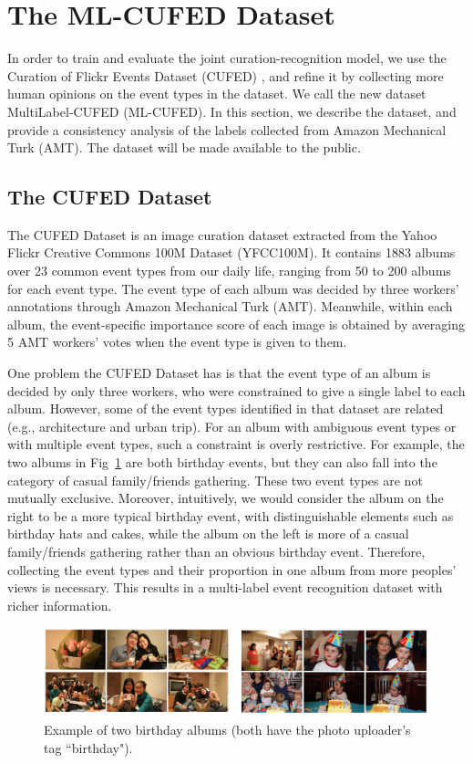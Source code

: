 \documentclass[runningheads]{llncs}
\begin{document}
\section{The ML-CUFED Dataset}
In order to train and evaluate the joint curation-recognition model, we use the Curation of Flickr Events Dataset (CUFED) \cite{CVPR}, and refine it by collecting more human opinions on the event types in the dataset. We call the new dataset MultiLabel-CUFED (ML-CUFED). In this section, we describe the dataset, and provide a consistency analysis of the labels collected from Amazon Mechanical Turk (AMT). The dataset will be made available to the public.
\subsection{The CUFED Dataset}
The CUFED Dataset \cite{CVPR} is an image curation dataset extracted from the Yahoo Flickr Creative Commons 100M Dataset (YFCC100M).  It contains 1883 albums over 23 common event types from our daily life, ranging from 50 to 200 albums for each event type. The event type of each album was decided by three workers' annotations through Amazon Mechanical Turk (AMT). Meanwhile, within each album, the event-specific importance score of each image is obtained by averaging 5 AMT workers' votes when the event type is given to them. 

One problem the CUFED Dataset has is that the event type of an album is decided by only three workers, who were constrained to give a single label to each album. However, some of the event types identified in that dataset are related (e.g., architecture and urban trip). For an album with ambiguous event types or with multiple event types, such a constraint is overly restrictive. For example, the two albums in Fig~\ref{album} are both birthday events, but they can also fall into the category of casual family/friends gathering. These two event types are not mutually exclusive. Moreover, intuitively, we would consider the album on the right to be a more typical birthday event, with distinguishable elements such as birthday hats and cakes, while the album on the left is more of a casual family/friends gathering rather than an obvious birthday event. Therefore, collecting the event types and their proportion in one album from more peoples' views is necessary. This results in a multi-label event recognition dataset with richer information. 
%
%
%
\begin{figure}
\centering
\includegraphics[width=4.5in]{album}
\caption{Example of two birthday albums (both have the photo uploader's tag ``birthday"). }
\label{album}
\vspace{-0.15in}
\end{figure}
\end{document}
